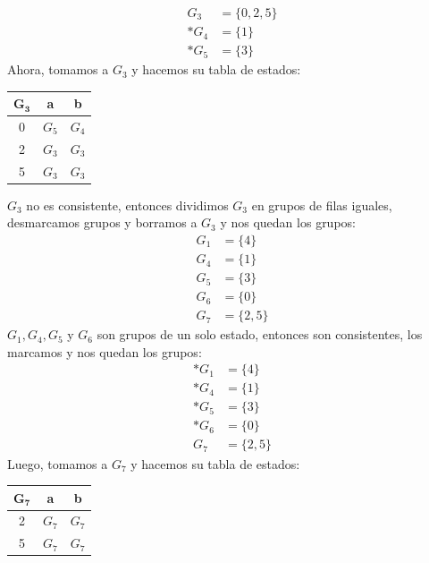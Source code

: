 \documentclass[12pt, letterpaper]{article}
\begin{document}
\begin{enumerate}
\begin{enumerate}
\begin{align*}
        G_3 &= \{0, 2, 5\} \\
        \ast G_4 &= \{1\} \\
        \ast G_5 &= \{3\}
      \end{align*}
      Ahora, tomamos a $G_3$ y hacemos su tabla de estados:
      \begin{table}[H]
        \centering
        \begin{tabular}{|c|c|c|}
          \hline
          $\bm{G_3}$ & \textbf{a} & \textbf{b} \\ \hline
          0             & $G_5$   & $G_4$       \\ \hline
          2             & $G_3$   & $G_3$       \\ \hline
          5             & $G_3$   & $G_3$       \\ \hline
        \end{tabular}
      \end{table}
      $G_3$ no es consistente, entonces dividimos $G_3$ en grupos de filas iguales, desmarcamos grupos y borramos a $G_3$ y nos quedan los grupos:
      \begin{align*}
        G_1 &= \{4\} \\
        G_4 &= \{1\} \\
        G_5 &= \{3\} \\
        G_6 &= \{0\} \\
        G_7 &= \{2, 5\}
      \end{align*}
      $G_1, G_4, G_5$ y $G_6$ son grupos de un solo estado, entonces son consistentes, los marcamos y nos quedan los grupos:
      \begin{align*}
        \ast G_1 &= \{4\} \\
        \ast G_4 &= \{1\} \\
        \ast G_5 &= \{3\} \\
        \ast G_6 &= \{0\} \\
        G_7 &= \{2, 5\}
      \end{align*}
      Luego, tomamos a $G_7$ y hacemos su tabla de estados: 
      \begin{table}[H]
        \centering
        \begin{tabular}{|c|c|c|}
          \hline
          $\bm{G_7}$ & \textbf{a} & \textbf{b} \\ \hline
          2             & $G_7$   & $G_7$       \\ \hline
          5             & $G_7$   & $G_7$       \\ \hline
        \end{tabular}

\end{table}
\end{enumerate}
\end{enumerate}
\end{document}

